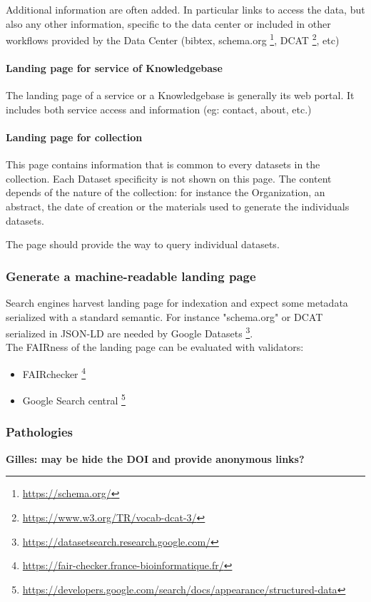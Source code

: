 \documentclass[11pt,a4paper]{ivoa}
\begin{document}
Additional information are often added. In particular links to access the data, but also any other information, specific to the data center or included in other workflows provided by the Data Center (bibtex, schema.org \footnote{\url{https://schema.org/}}, DCAT \footnote{\url{https://www.w3.org/TR/vocab-dcat-3/}}, etc)


\paragraph{Landing page for service of Knowledgebase}
The landing page of a service or a Knowledgebase is generally its web portal. It includes both service access and information (eg: contact, about, etc.)

\paragraph{Landing page for collection}
This page contains information that is common to every datasets in the collection. Each Dataset specificity is not shown on this page. The content depends of the nature of the collection: for instance the Organization, an abstract, the date of creation or the materials used to generate the individuals datasets.

The page should provide the way to query individual datasets.

\subsubsection{Generate a machine-readable landing page}
Search engines harvest landing page for indexation and expect some metadata serialized with a standard semantic. For instance "schema.org" or DCAT serialized in JSON-LD are needed by Google Datasets \footnote{\url{https://datasetsearch.research.google.com/}}.\\


The FAIRness of the landing page can be evaluated with validators:
\begin{itemize}
    \item FAIRchecker \footnote{\url{https://fair-checker.france-bioinformatique.fr/}}
    \item Google Search central \footnote{\url{https://developers.google.com/search/docs/appearance/structured-data}}
\end{itemize}


\subsubsection{Pathologies}
\textbf{\color{red} Gilles: may be hide the DOI and provide anonymous links?\\}
\end{document}
